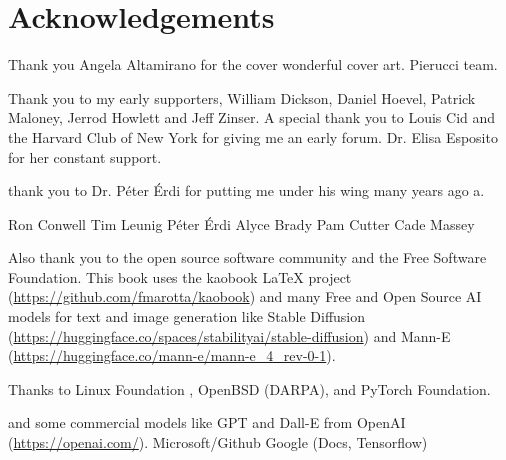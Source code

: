 \let\cleardoublepage\clearpage
\chapter*{Acknowledgements}

Thank you Angela Altamirano for the cover wonderful cover art. Pierucci team. 

Thank you to my early supporters, William Dickson, Daniel Hoevel, Patrick Maloney, Jerrod Howlett and Jeff Zinser. A special thank you to Louis Cid and the Harvard Club of New York for giving me an early forum. Dr. Elisa Esposito for her constant support. 

thank you to Dr. Péter Érdi for putting me under his wing many years ago a.

Ron Conwell
Tim Leunig
Péter Érdi
Alyce Brady
Pam Cutter
Cade Massey

Also thank you to the open source software community and the Free Software Foundation. This book uses the kaobook LaTeX project (\url{https://github.com/fmarotta/kaobook}) and  many Free and Open Source AI  models for text and image generation like Stable Diffusion (\url{https://huggingface.co/spaces/stabilityai/stable-diffusion}) and Mann-E (\url{https://huggingface.co/mann-e/mann-e_4_rev-0-1}). 

Thanks to Linux Foundation , OpenBSD (DARPA), and PyTorch Foundation. 

and some commercial models like GPT and Dall-E from OpenAI (\url{https://openai.com/}).
Microsoft/Github
Google (Docs, Tensorflow)
